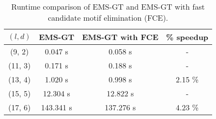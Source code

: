 \begin{table}[h] %
	\renewcommand{\arraystretch}{1.3}
	\centering
	\begin{tabular}{|c|c|c|c|}
	\hline 
	\bfseries\boldmath $(l,d)$ & 
	\bfseries\boldmath EMS-GT & 
	\bfseries\boldmath EMS-GT with FCE & 
	\bfseries \% speedup\\
	\hline
	(9, 2) & 0.047 s &		0.058 s 	&	- \\
	(11, 3) & 0.171 s &		0.188 s 	&	- \\
	(13, 4) & 1.020 s &		0.998 s 	&	2.15 \%\\
	(15, 5) & 12.304 s &	12.822 s  	&	- \\
	(17, 6) & 143.341 s &	137.276 s 	&	4.23 \%\\
	\hline\end{tabular}
	
	\caption{Runtime comparison of EMS-GT and EMS-GT with fast candidate motif elimination (FCE).}
	\label{tbl:ems-gt-fce-speedup}
\end{table}



